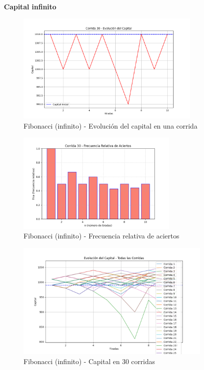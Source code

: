 \documentclass{article}
\begin{document}
\textbf{Capital infinito}

\begin{figure}
    \centering
    \includegraphics[width=0.8\textwidth]{./images/capital_corrida_30_f_i.png}
    \caption{Fibonacci (infinito) - Evolución del capital en una corrida}
\end{figure}

\begin{figure}
    \centering
    \includegraphics[width=0.7\textwidth]{./images/frsa_corrida_30_f_i.png}
    \caption{Fibonacci (infinito) - Frecuencia relativa de aciertos}
\end{figure}

\begin{figure}
    \centering
    \includegraphics[width=0.85\textwidth]{./images/capital_todas_corridas_f_i.png}
    \caption{Fibonacci (infinito) - Capital en 30 corridas}
\end{figure}
\end{document}
